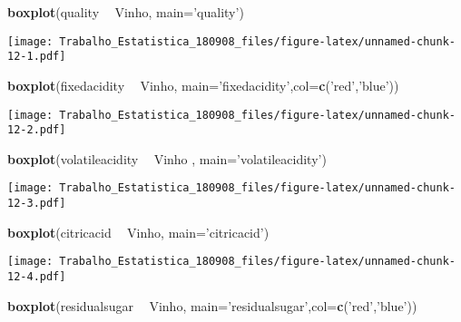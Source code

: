 \documentclass[]{article}
\newenvironment{Shaded}{\begin{snugshade}}{\end{snugshade}}
\newcommand{\KeywordTok}[1]{\textcolor[rgb]{0.13,0.29,0.53}{\textbf{#1}}}
\newcommand{\DataTypeTok}[1]{\textcolor[rgb]{0.13,0.29,0.53}{#1}}
\newcommand{\StringTok}[1]{\textcolor[rgb]{0.31,0.60,0.02}{#1}}
\newcommand{\OperatorTok}[1]{\textcolor[rgb]{0.81,0.36,0.00}{\textbf{#1}}}
\newcommand{\NormalTok}[1]{#1}
\begin{document}
\begin{Shaded}
\begin{Highlighting}[]
\KeywordTok{boxplot}\NormalTok{(quality }\OperatorTok{~}\StringTok{ }\NormalTok{Vinho, }\DataTypeTok{main=}\StringTok{'quality'}\NormalTok{)}
\end{Highlighting}
\end{Shaded}

\texttt{[image: Trabalho\_Estatistica\_180908\_files/figure-latex/unnamed-chunk-12-1.pdf]}

\begin{Shaded}
\begin{Highlighting}[]
\KeywordTok{boxplot}\NormalTok{(fixedacidity }\OperatorTok{~}\StringTok{ }\NormalTok{Vinho, }\DataTypeTok{main=}\StringTok{'fixedacidity'}\NormalTok{,}\DataTypeTok{col=}\KeywordTok{c}\NormalTok{(}\StringTok{'red'}\NormalTok{,}\StringTok{'blue'}\NormalTok{))}
\end{Highlighting}
\end{Shaded}

\texttt{[image: Trabalho\_Estatistica\_180908\_files/figure-latex/unnamed-chunk-12-2.pdf]}

\begin{Shaded}
\begin{Highlighting}[]
\KeywordTok{boxplot}\NormalTok{(volatileacidity }\OperatorTok{~}\StringTok{ }\NormalTok{Vinho , }\DataTypeTok{main=}\StringTok{'volatileacidity'}\NormalTok{)}
\end{Highlighting}
\end{Shaded}

\texttt{[image: Trabalho\_Estatistica\_180908\_files/figure-latex/unnamed-chunk-12-3.pdf]}

\begin{Shaded}
\begin{Highlighting}[]
\KeywordTok{boxplot}\NormalTok{(citricacid }\OperatorTok{~}\StringTok{ }\NormalTok{Vinho, }\DataTypeTok{main=}\StringTok{'citricacid'}\NormalTok{)}
\end{Highlighting}
\end{Shaded}

\texttt{[image: Trabalho\_Estatistica\_180908\_files/figure-latex/unnamed-chunk-12-4.pdf]}

\begin{Shaded}
\begin{Highlighting}[]
\KeywordTok{boxplot}\NormalTok{(residualsugar }\OperatorTok{~}\StringTok{ }\NormalTok{Vinho, }\DataTypeTok{main=}\StringTok{'residualsugar'}\NormalTok{,}\DataTypeTok{col=}\KeywordTok{c}\NormalTok{(}\StringTok{'red'}\NormalTok{,}\StringTok{'blue'}\NormalTok{))}
\end{Highlighting}
\end{Shaded}
\end{document}
